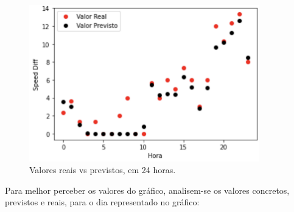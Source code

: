 \documentclass[a4paper, 12pt]{article}
\begin{document}
\begin{figure}[H]
	\centering
	\includegraphics[width=10cm]{resultados/real_prev_2.png}
	\caption{Valores reais vs previstos, em 24 horas.}
\end{figure}

Para melhor perceber os valores do gráfico, analisem-se os valores concretos, previstos e reais, para o dia representado no gráfico:
\end{document}

